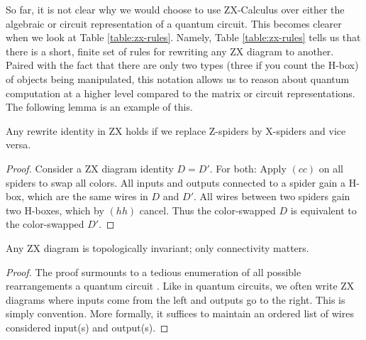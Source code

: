 

So far, it is not clear why we would choose to use ZX-Calculus over either the algebraic or circuit representation of a quantum circuit. This becomes clearer when we look at Table \ref{table:zx-rules}. Namely, Table \ref{table:zx-rules} tells us that there is a short, finite set of rules for rewriting any ZX diagram to another. Paired with the fact that there are only two types (three if you count the H-box) of objects being manipulated, this notation allows us to reason about quantum computation at a higher level compared to the matrix or circuit representations. The following lemma is an example of this.

\begin{lemma} 
\label{lemma:color-change}
Any rewrite identity in ZX holds if we replace Z-spiders by X-spiders and vice versa.
\end{lemma}

\begin{proof}
Consider a ZX diagram identity $D = D'$. For both: Apply $(cc)$ on all spiders to swap all colors. All inputs and outputs connected to a spider gain a H-box, which are the same wires in $D$ and $D'$. All wires between two spiders gain two H-boxes, which by $(hh)$ cancel. Thus the color-swapped $D$ is equivalent to the color-swapped $D'$.
\end{proof}

\begin{theorem}
\label{thm:yanking}
Any ZX diagram is topologically invariant; only connectivity matters.
\end{theorem}

\begin{proof}
The proof surmounts to a tedious enumeration of all possible rearrangements a quantum circuit \cite{PQP}. Like in quantum circuits, we often write ZX diagrams where inputs come from the left and outputs go to the right. This is simply convention. More formally, it suffices to maintain an ordered list of wires considered input(s) and output(s).
\end{proof}


